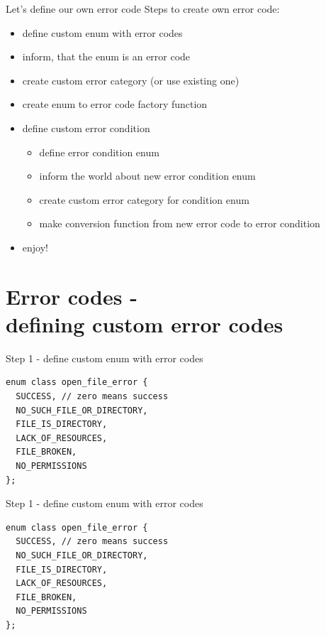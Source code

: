 \documentclass[10pt]{beamer}
\begin{document}
\begin{frame}{Let's define our own error code}
	Steps to create own error code:
	\begin{itemize}[<+- | alert@+>]
		\item define custom enum with error codes
		\item inform, that the enum is an error code
		\item create custom error category (or use existing one)
		\item create enum to error code factory function
		\item define custom error condition
		\begin{itemize}
			\item define error condition enum
			\item inform the world about new error condition enum
			\item create custom error category for condition enum
			\item make conversion function from new error code to error condition
		\end{itemize}
		\item enjoy!
	\end{itemize}
\end{frame}

\section{Error codes - \\ defining custom error codes}

\begin{frame}[fragile]{Step 1 - define custom enum with error codes}
	\begin{verbatim}
enum class open_file_error {
  SUCCESS, // zero means success
  NO_SUCH_FILE_OR_DIRECTORY,
  FILE_IS_DIRECTORY,
  LACK_OF_RESOURCES,
  FILE_BROKEN,
  NO_PERMISSIONS
};
	\end{verbatim}
\end{frame}

\begin{frame}[fragile]{Step 1 - define custom enum with error codes}
\begin{verbatim}
enum class open_file_error {
  SUCCESS, // zero means success
  NO_SUCH_FILE_OR_DIRECTORY,
  FILE_IS_DIRECTORY,
  LACK_OF_RESOURCES,
  FILE_BROKEN,
  NO_PERMISSIONS
};
\end{verbatim}
\end{frame}
\end{document}
